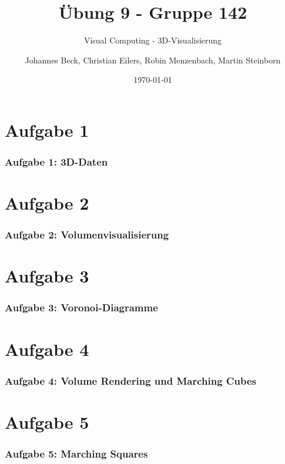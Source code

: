 \documentclass[accentcolor=tud9c,colorbacktitle,inverttitle,landscape,german,presentation,t]{tudbeamer}
\begin{document}
\title{\"Ubung 9 - Gruppe 142}
\subtitle{Visual Computing - 3D-Visualisierung}

\author[Johannes Beck, Christian Eilers, Robin Menzenbach, Martin Steinborn]{Johannes Beck, Christian Eilers, Robin Menzenbach, Martin Steinborn}


\date{\today}

\begin{titleframe}
\end{titleframe}

\section{Aufgabe 1}
	\begin{frame}
		\frametitle{Aufgabe 1: 3D-Daten}
	\end{frame}

\section{Aufgabe 2}
\begin{frame}
	\frametitle{Aufgabe 2: Volumenvisualisierung}
\end{frame}

\section{Aufgabe 3}
\begin{frame}
	\frametitle{Aufgabe 3: Voronoi-Diagramme} 
\end{frame}

\section{Aufgabe 4}
\begin{frame}
	\frametitle{Aufgabe 4: Volume Rendering und Marching Cubes}
\end{frame}

\section{Aufgabe 5}
\begin{frame}
	\frametitle{Aufgabe 5: Marching Squares}
\end{frame}
\end{document}
